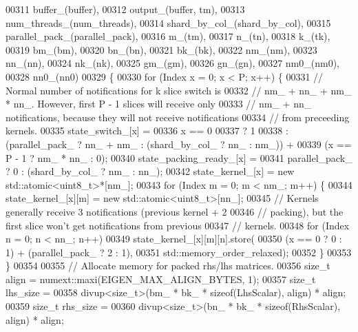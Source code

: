 \begin{DoxyCode}
00311           buffer\_(buffer),
00312           output\_(buffer, tm),
00313           num\_threads\_(num\_threads),
00314           shard\_by\_col\_(shard\_by\_col),
00315           parallel\_pack\_(parallel\_pack),
00316           m\_(tm),
00317           n\_(tn),
00318           k\_(tk),
00319           bm\_(bm),
00320           bn\_(bn),
00321           bk\_(bk),
00322           nm\_(nm),
00323           nn\_(nn),
00324           nk\_(nk),
00325           gm\_(gm),
00326           gn\_(gn),
00327           nm0\_(nm0),
00328           nn0\_(nn0)
00329   \{
00330       \textcolor{keywordflow}{for} (Index x = 0; x < P; x++) \{
00331         \textcolor{comment}{// Normal number of notifications for k slice switch is}
00332         \textcolor{comment}{// nm\_ + nn\_ + nm\_ * nn\_. However, first P - 1 slices will receive only}
00333         \textcolor{comment}{// nm\_ + nn\_ notifications, because they will not receive notifications}
00334         \textcolor{comment}{// from preceeding kernels.}
00335         state\_switch\_[x] =
00336             x == 0
00337                 ? 1
00338                 : (parallel\_pack\_ ? nn\_ + nm\_ : (shard\_by\_col\_ ? nn\_ : nm\_)) +
00339                       (x == P - 1 ? nm\_ * nn\_ : 0);
00340         state\_packing\_ready\_[x] =
00341             parallel\_pack\_ ? 0 : (shard\_by\_col\_ ? nm\_ : nn\_);
00342         state\_kernel\_[x] = \textcolor{keyword}{new} std::atomic<uint8\_t>*[nm\_];
00343         \textcolor{keywordflow}{for} (Index m = 0; m < nm\_; m++) \{
00344           state\_kernel\_[x][m] = \textcolor{keyword}{new} std::atomic<uint8\_t>[nn\_];
00345           \textcolor{comment}{// Kernels generally receive 3 notifications (previous kernel + 2}
00346           \textcolor{comment}{// packing), but the first slice won't get notifications from previous}
00347           \textcolor{comment}{// kernels.}
00348           \textcolor{keywordflow}{for} (Index n = 0; n < nn\_; n++)
00349             state\_kernel\_[x][m][n].store(
00350                 (x == 0 ? 0 : 1) + (parallel\_pack\_ ? 2 : 1),
00351                 std::memory\_order\_relaxed);
00352         \}
00353       \}
00354 
00355       \textcolor{comment}{// Allocate memory for packed rhs/lhs matrices.}
00356       \textcolor{keywordtype}{size\_t} align = numext::maxi(EIGEN\_MAX\_ALIGN\_BYTES, 1);
00357       \textcolor{keywordtype}{size\_t} lhs\_size =
00358           divup<size\_t>(bm\_ * bk\_ * \textcolor{keyword}{sizeof}(LhsScalar), align) * align;
00359       \textcolor{keywordtype}{size\_t} rhs\_size =
00360           divup<size\_t>(bn\_ * bk\_ * \textcolor{keyword}{sizeof}(RhsScalar), align) * align;

\end{DoxyCode}
